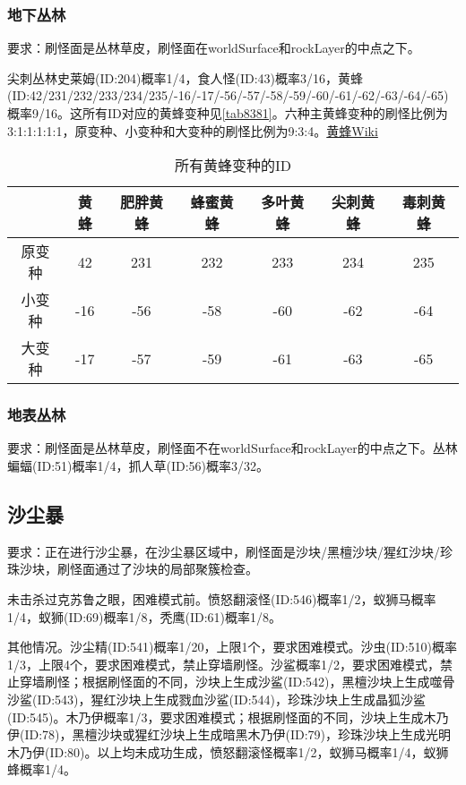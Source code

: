 \subsubsection{地下丛林}
要求：刷怪面是丛林草皮，刷怪面在worldSurface和rockLayer的中点之下。

尖刺丛林史莱姆(ID:204)概率1/4，食人怪(ID:43)概率3/16，黄蜂(ID:42/231/232/233/234/235/-16/-17/-56/-57/-58/-59/-60/-61/-62/-63/-64/-65)概率9/16。这所有ID对应的黄蜂变种见\autoref{tab8381}。六种主黄蜂变种的刷怪比例为3:1:1:1:1:1，原变种、小变种和大变种的刷怪比例为9:3:4。\href{https://terraria-zh.gamepedia.com/黄蜂}{黄蜂Wiki}

\begin{table}[!h]
    \centering
    \begin{tabular}{c|cccccc}
         &黄蜂&肥胖黄蜂&蜂蜜黄蜂&多叶黄蜂&尖刺黄蜂&毒刺黄蜂\\\hline
         原变种&42&231&232&233&234&235\\
         小变种&-16&-56&-58&-60&-62&-64\\
         大变种&-17&-57&-59&-61&-63&-65
    \end{tabular}
    \caption{所有黄蜂变种的ID}
    \label{tab8381}
\end{table}

\subsubsection{地表丛林}
要求：刷怪面是丛林草皮，刷怪面不在worldSurface和rockLayer的中点之下。丛林蝙蝠(ID:51)概率1/4，抓人草(ID:56)概率3/32。

\subsection{沙尘暴}
要求：正在进行沙尘暴，在沙尘暴区域中，刷怪面是沙块/黑檀沙块/猩红沙块/珍珠沙块，刷怪面通过了沙块的局部聚簇检查。

未击杀过克苏鲁之眼，困难模式前。愤怒翻滚怪(ID:546)概率1/2，蚁狮马概率1/4，蚁狮(ID:69)概率1/8，秃鹰(ID:61)概率1/8。

其他情况。沙尘精(ID:541)概率1/20，上限1个，要求困难模式。沙虫(ID:510)概率1/3，上限4个，要求困难模式，禁止穿墙刷怪。沙鲨概率1/2，要求困难模式，禁止穿墙刷怪；根据刷怪面的不同，沙块上生成沙鲨(ID:542)，黑檀沙块上生成噬骨沙鲨(ID:543)，猩红沙块上生成戮血沙鲨(ID:544)，珍珠沙块上生成晶狐沙鲨(ID:545)。木乃伊概率1/3，要求困难模式；根据刷怪面的不同，沙块上生成木乃伊(ID:78)，黑檀沙块或猩红沙块上生成暗黑木乃伊(ID:79)，珍珠沙块上生成光明木乃伊(ID:80)。以上均未成功生成，愤怒翻滚怪概率1/2，蚁狮马概率1/4，蚁狮蜂概率1/4。

